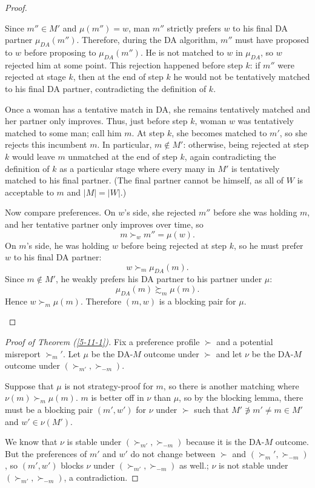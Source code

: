 \begin{proof}
\begin{description}
		Since $m'' \in M'$ and $\mu(m'')=w$, man $m''$ strictly prefers $w$ to his final DA partner $\mu_{DA}(m'')$.
		Therefore, during the DA algorithm, $m''$ must have proposed to $w$ before proposing to $\mu_{DA}(m'')$.
		He is not matched to $w$ in $\mu_{DA}$, so $w$ rejected him at some point.
		This rejection happened before step $k$: if $m''$ were rejected at stage $k$, then at the end of step $k$ he would not be tentatively matched to his final DA partner, contradicting the definition of $k$.

		Once a woman has a tentative match in DA, she remains tentatively matched and her partner only improves.
		Thus, just before step $k$, woman $w$ was tentatively matched to some man; call him $m$.
		At step $k$, she becomes matched to $m'$, so she rejects this incumbent $m$.
		In particular, $m \not\in M'$: otherwise, being rejected at step $k$ would leave $m$ unmatched at the end of step $k$, again contradicting the definition of $k$ as a particular stage where every many in $M'$ is tentatively matched to his final partner. (The final partner cannot be himself, as all of $W$ is acceptable to $m$ and $\left| M \right| = \left| W \right|$.)

		Now compare preferences.
		On $w$'s side, she rejected $m''$ before she was holding $m$, and her tentative partner only improves over time, so \[
			m \succ_w m'' = \mu(w)
		.\]
		On $m$'s side, he was holding $w$ before being rejected at step $k$, so he must prefer $w$ to his final DA partner: \[
			w \succ_m \mu_{DA}(m)
		.\]
		Since $m \not\in M'$, he weakly prefers his DA partner to his partner under $\mu$: \[
			\mu_{DA}(m) \succsim_m \mu(m)
		.\]
		Hence $w \succ_m \mu(m)$.
		Therefore $(m,w)$ is a blocking pair for $\mu$.
	\end{description}
\end{proof}

\theoremproofstyle

\begin{proof}[Proof of Theorem (\ref{5-11-1})]
	Fix a preference profile $\succ$ and a potential misreport $\succ_m'$.
	Let $\mu$ be the DA-$M$ outcome under $\succ$ and let $\nu$ be the DA-$M$ outcome under $(\succ_{m'}, \succ_{-m})$.

	Suppose that $\mu$ is not strategy-proof for $m$, so there is another matching where $\nu(m) \succ_{m} \mu(m)$.
	$m$ is better off in $\nu$ than $\mu$, so by the blocking lemma, there must be a blocking pair $(m',w')$ for $\nu$ under $\succ$ such that $M' \not\ni m' \ne m \in M'$ and $w' \in \nu(M')$.

	We know that $\nu$ is stable under $(\succ_{m'}, \succ_{-m})$ because it is the DA-$M$ outcome.
	But the preferences of $m'$ and $w'$ do not change between $\succ$ and $(\succ_m', \succ_{-m})$, so $(m',w')$ blocks $\nu$ under $(\succ_{m'},\succ_{-m})$ as well.; $\nu$ is not stable under $(\succ_{m'}, \succ_{-m})$, a contradiction.
\end{proof}

